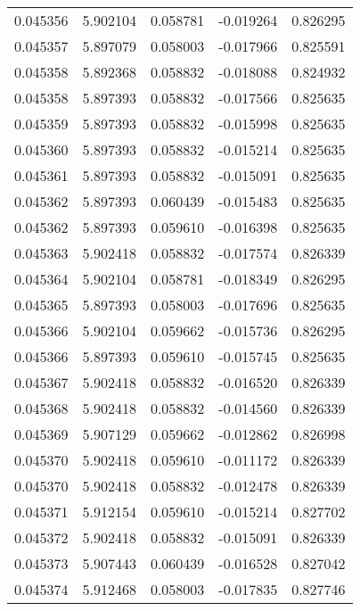 \begin{tabular}{lrrrr}
0.045356    &  5.902104 &  0.058781 & -0.019264 &             0.826295 \\
0.045357    &  5.897079 &  0.058003 & -0.017966 &             0.825591 \\
0.045358    &  5.892368 &  0.058832 & -0.018088 &             0.824932 \\
0.045358    &  5.897393 &  0.058832 & -0.017566 &             0.825635 \\
0.045359    &  5.897393 &  0.058832 & -0.015998 &             0.825635 \\
0.045360    &  5.897393 &  0.058832 & -0.015214 &             0.825635 \\
0.045361    &  5.897393 &  0.058832 & -0.015091 &             0.825635 \\
0.045362    &  5.897393 &  0.060439 & -0.015483 &             0.825635 \\
0.045362    &  5.897393 &  0.059610 & -0.016398 &             0.825635 \\
0.045363    &  5.902418 &  0.058832 & -0.017574 &             0.826339 \\
0.045364    &  5.902104 &  0.058781 & -0.018349 &             0.826295 \\
0.045365    &  5.897393 &  0.058003 & -0.017696 &             0.825635 \\
0.045366    &  5.902104 &  0.059662 & -0.015736 &             0.826295 \\
0.045366    &  5.897393 &  0.059610 & -0.015745 &             0.825635 \\
0.045367    &  5.902418 &  0.058832 & -0.016520 &             0.826339 \\
0.045368    &  5.902418 &  0.058832 & -0.014560 &             0.826339 \\
0.045369    &  5.907129 &  0.059662 & -0.012862 &             0.826998 \\
0.045370    &  5.902418 &  0.059610 & -0.011172 &             0.826339 \\
0.045370    &  5.902418 &  0.058832 & -0.012478 &             0.826339 \\
0.045371    &  5.912154 &  0.059610 & -0.015214 &             0.827702 \\
0.045372    &  5.902418 &  0.058832 & -0.015091 &             0.826339 \\
0.045373    &  5.907443 &  0.060439 & -0.016528 &             0.827042 \\
0.045374    &  5.912468 &  0.058003 & -0.017835 &             0.827746 \\

\end{tabular}
